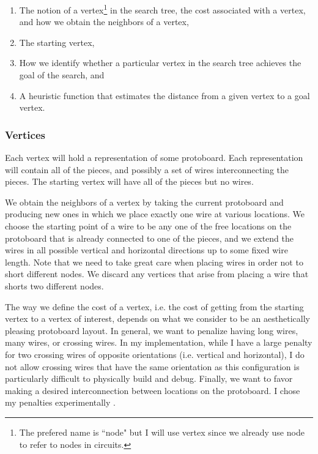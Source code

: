 \begin{enumerate}
\item The notion of a vertex\footnote{The prefered name is ``node" but I will
use vertex since we already use node to refer to nodes in circuits.} in the
search tree, the cost associated with a vertex, and how we obtain the neighbors
of a vertex,
\item The starting vertex,
\item How we identify whether a particular vertex in the search tree achieves
the goal of the search, and
\item A heuristic function that estimates the distance from a given vertex to a
goal vertex.
\end{enumerate}

\subsubsection{Vertices}

Each vertex will hold a representation of some protoboard. Each representation
will contain all of the pieces, and possibly a set of wires interconnecting the
pieces. The starting vertex will have all of the pieces but no wires.

We obtain the neighbors of a vertex by taking the current protoboard and
producing new ones in which we place exactly one wire at various locations. We
choose the starting point of a wire to be any one of the free locations on the
protoboard that is already connected to one of the pieces, and we extend the
wires in all possible vertical and horizontal directions up to some fixed wire
length. Note that we need
to take great care when placing wires in order not to short different nodes. We
discard any vertices that arise from placing a wire that shorts two different
nodes.

The way we define the cost of a vertex, i.e. the cost of getting from the
starting vertex to a vertex of interest, depends on what we consider to be an
aesthetically pleasing protoboard layout. In general, we want to penalize having
long wires, many wires, or crossing wires. In my implementation, while I have
a large penalty for two crossing wires of opposite orientations (i.e. vertical
and horizontal), I do not allow crossing wires that have the same orientation as
this configuration is particularly difficult to physically build and debug.
Finally, we want to favor making a desired interconnection between locations
on the protoboard. I chose my penalties experimentally
\q.

